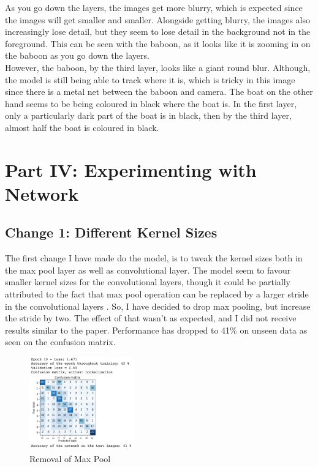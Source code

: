 \documentclass{article}
\begin{document}
    As you go down the layers, the images get more blurry, which is expected since the images will get smaller and smaller. Alongside getting blurry, the images also increasingly lose detail, but they seem to lose detail in the background not in the foreground. This can be seen with the baboon, as it looks like it is zooming in on the baboon as you go down the layers.\\
    
    However, the baboon, by the third layer, looks like a giant round blur. Although, the model is still being able to track where it is, which is tricky in this image since there is a metal net between the baboon and camera. The boat on the other hand seems to be being coloured in black where the boat is. In the first layer, only a particularly dark part of the boat is in black, then by the third layer, almost half the boat is coloured in black.\\


    \section{Part IV: Experimenting with Network}


    \subsection{Change 1: Different Kernel Sizes}

    The first change I have made do the model, is to tweak the kernel sizes both in the max pool layer as well as convolutional layer. The model seem to favour smaller kernel sizes for the convolutional layers, though it could be partially attributed to the fact that max pool operation can be replaced by a larger stride in the convolutional layers \cite{maxpoolrep}. So, I have decided to drop max pooling, but increase the stride by two. The effect of that wasn't as expected, and I did not receive results similar to the paper. Performance has dropped to 41\% on unseen data as seen on the confusion matrix.\\

    \begin{figure}[h!]
        \centering
        \includegraphics[width=0.4\textwidth]{first_final}
        \caption{Removal of Max Pool}
    \end{figure}
\end{document}
